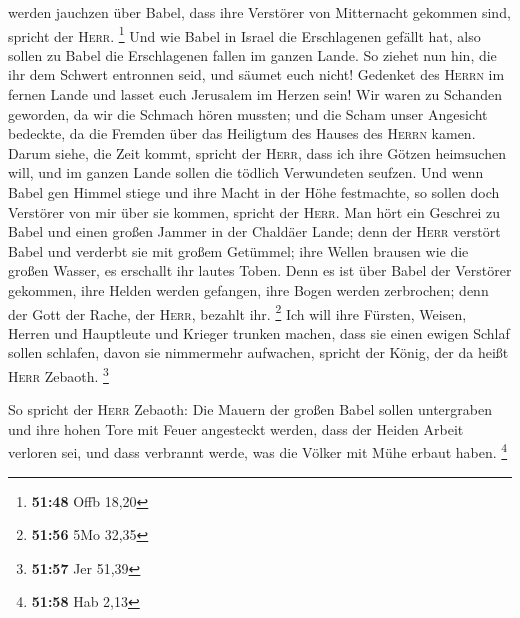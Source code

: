 werden jauchzen über Babel, dass ihre Verstörer von Mitternacht gekommen
sind, spricht der \textsc{Herr}. \footnote{\textbf{51:48} Offb 18,20}
 Und wie Babel in Israel die Erschlagenen gefällt hat,
also sollen zu Babel die Erschlagenen fallen im ganzen Lande.
 So ziehet nun hin, die ihr dem Schwert entronnen seid,
und säumet euch nicht! Gedenket des \textsc{Herrn} im fernen Lande und
lasset euch Jerusalem im Herzen sein!  Wir waren zu
Schanden geworden, da wir die Schmach hören mussten; und die Scham unser
Angesicht bedeckte, da die Fremden über das Heiligtum des Hauses des
\textsc{Herrn} kamen.  Darum siehe, die Zeit kommt,
spricht der \textsc{Herr}, dass ich ihre Götzen heimsuchen will, und im
ganzen Lande sollen die tödlich Verwundeten seufzen.  Und
wenn Babel gen Himmel stiege und ihre Macht in der Höhe festmachte, so
sollen doch Verstörer von mir über sie kommen, spricht der
\textsc{Herr}.  Man hört ein Geschrei zu Babel und einen
großen Jammer in der Chaldäer Lande;  denn der
\textsc{Herr} verstört Babel und verderbt sie mit großem Getümmel; ihre
Wellen brausen wie die großen Wasser, es erschallt ihr lautes Toben.
 Denn es ist über Babel der Verstörer gekommen, ihre
Helden werden gefangen, ihre Bogen werden zerbrochen; denn der Gott der
Rache, der \textsc{Herr}, bezahlt ihr. \footnote{\textbf{51:56} 5Mo
  32,35}  Ich will ihre Fürsten, Weisen, Herren und
Hauptleute und Krieger trunken machen, dass sie einen ewigen Schlaf
sollen schlafen, davon sie nimmermehr aufwachen, spricht der König, der
da heißt \textsc{Herr} Zebaoth. \footnote{\textbf{51:57} Jer 51,39}

 So spricht der \textsc{Herr} Zebaoth: Die Mauern der
großen Babel sollen untergraben und ihre hohen Tore mit Feuer angesteckt
werden, dass der Heiden Arbeit verloren sei, und dass verbrannt werde,
was die Völker mit Mühe erbaut haben. \footnote{\textbf{51:58} Hab 2,13}


